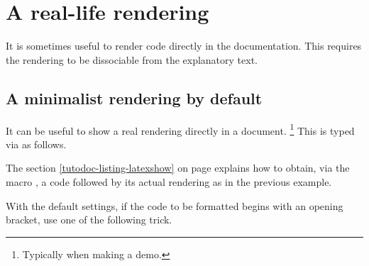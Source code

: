 \documentclass{tutodoc}
\begin{document}
\section{A real-life rendering}
\label{tutodoc-showcase}

It is sometimes useful to render code directly in the documentation. This requires the rendering to be dissociable from the explanatory text.



\subsection{A minimalist rendering by default}

\begin{tdocexa}
    It can be useful to show a real rendering directly in a document.
    \footnote{
        Typically when making a demo.
    }
    This is typed via  as follows.

\end{tdocexa}


\begin{tdocrem}
    The section \ref{tutodoc-listing-latexshow} on page \pageref{tutodoc-listing-latexshow} explains how to obtain, via the macro , a code followed by its actual rendering as in the previous example.
\end{tdocrem}


\begin{tdocwarn}
    With the default settings, if the code to be formatted begins with an opening bracket, use one of the following trick.

\end{tdocwarn}
\end{document}
